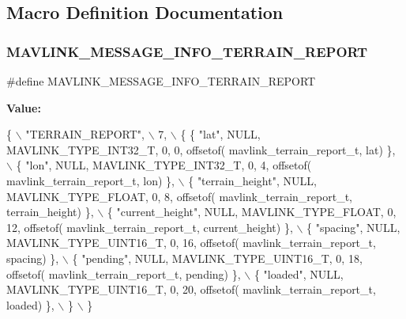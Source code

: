 \subsection{Macro Definition Documentation}
\mbox{\label{mavlink__msg__terrain__report_8h_a1a1e0151a5140d379bedd43290a4e51f}} 
\subsubsection{M\+A\+V\+L\+I\+N\+K\+\_\+\+M\+E\+S\+S\+A\+G\+E\+\_\+\+I\+N\+F\+O\+\_\+\+T\+E\+R\+R\+A\+I\+N\+\_\+\+R\+E\+P\+O\+RT}
{\footnotesize\ttfamily \#define M\+A\+V\+L\+I\+N\+K\+\_\+\+M\+E\+S\+S\+A\+G\+E\+\_\+\+I\+N\+F\+O\+\_\+\+T\+E\+R\+R\+A\+I\+N\+\_\+\+R\+E\+P\+O\+RT}

{\bfseries Value\+:}
\begin{DoxyCode}
\{ \(\backslash\)
    \textcolor{stringliteral}{"TERRAIN\_REPORT"}, \(\backslash\)
    7, \(\backslash\)
    \{  \{ \textcolor{stringliteral}{"lat"}, NULL, MAVLINK_TYPE_INT32_T, 0, 0, offsetof(
      mavlink_terrain_report_t, lat) \}, \(\backslash\)
         \{ \textcolor{stringliteral}{"lon"}, NULL, MAVLINK_TYPE_INT32_T, 0, 4, offsetof(
      mavlink_terrain_report_t, lon) \}, \(\backslash\)
         \{ \textcolor{stringliteral}{"terrain\_height"}, NULL, MAVLINK_TYPE_FLOAT, 0, 8, offsetof(
      mavlink_terrain_report_t, terrain\_height) \}, \(\backslash\)
         \{ \textcolor{stringliteral}{"current\_height"}, NULL, MAVLINK_TYPE_FLOAT, 0, 12, offsetof(
      mavlink_terrain_report_t, current\_height) \}, \(\backslash\)
         \{ \textcolor{stringliteral}{"spacing"}, NULL, MAVLINK_TYPE_UINT16_T, 0, 16, offsetof(
      mavlink_terrain_report_t, spacing) \}, \(\backslash\)
         \{ \textcolor{stringliteral}{"pending"}, NULL, MAVLINK_TYPE_UINT16_T, 0, 18, offsetof(
      mavlink_terrain_report_t, pending) \}, \(\backslash\)
         \{ \textcolor{stringliteral}{"loaded"}, NULL, MAVLINK_TYPE_UINT16_T, 0, 20, offsetof(
      mavlink_terrain_report_t, loaded) \}, \(\backslash\)
         \} \(\backslash\)
\}
\end{DoxyCode}
\mbox{\label{mavlink__msg__terrain__report_8h_a859fdd0b804602f327321f22a9a66530}} 
